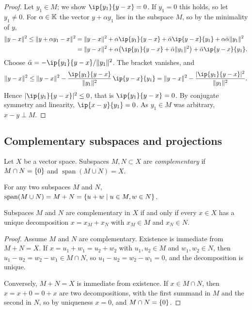 \begin{proof}
Let $y_1 \in M$; we show $\ip{y_1}{y - x} = 0$. If $y_1 = 0$ this holds, so
let $y_1 \ne 0$. For $\alpha \in \mathbb{K}$ the vector $y + \alpha y_1$ lies in the
subspace $M$, so by the minimality of $y$,
\[
  \begin{aligned}
    \norm{y - x}^2 \le \norm{y + \alpha y_1 - x}^2
    &= \norm{y - x}^2 + \alpha\ip{y_1}{y - x} + \bar{\alpha}\ip{y - x}{y_1}
       + \alpha\bar{\alpha}\norm{y_1}^2 \\
    &= \norm{y - x}^2 + \alpha\bigl(\ip{y_1}{y - x}
       + \bar{\alpha}\norm{y_1}^2\bigr) + \bar{\alpha}\ip{y - x}{y_1} .
  \end{aligned}
\]
Choose $\bar{\alpha} = -\ip{y_1}{y - x} / \norm{y_1}^2$. The bracket vanishes,
and
\[
  \norm{y - x}^2 \le \norm{y - x}^2
    - \frac{\ip{y_1}{y - x}}{\norm{y_1}^2}\,\ip{y - x}{y_1}
  = \norm{y - x}^2 - \frac{\abs{\ip{y_1}{y - x}}^2}{\norm{y_1}^2} .
\]
Hence $\abs{\ip{y_1}{y - x}}^2 \le 0$, that is $\ip{y_1}{y - x} = 0$. By
conjugate symmetry and linearity, $\ip{x - y}{y_1} = 0$. As $y_1 \in M$ was
arbitrary, $x - y \perp M$.
\end{proof}

\subsection{Complementary subspaces and projections}

\begin{definition}\label{def:complementary}
Let $X$ be a vector space. Subspaces $M, N \subset X$ are
\emph{complementary} if $M \cap N = \{0\}$ and
$\operatorname{span}(M \cup N) = X$.
\end{definition}

\begin{remark}
For any two subspaces $M$ and $N$,
$\operatorname{span}(M \cup N) = M + N = \{u + w \mid u \in M, w \in N\}$.
\end{remark}

\begin{lemma}\label{lem:complementary}
Subspaces $M$ and $N$ are complementary in $X$ if and only if every
$x \in X$ has a unique decomposition $x = x_M + x_N$ with $x_M \in M$ and
$x_N \in N$.
\end{lemma}

\begin{proof}
Assume $M$ and $N$ are complementary. Existence is immediate from
$M + N = X$. If $x = u_1 + w_1 = u_2 + w_2$ with $u_1, u_2 \in M$ and
$w_1, w_2 \in N$, then $u_1 - u_2 = w_2 - w_1 \in M \cap N$, so
$u_1 - u_2 = w_2 - w_1 = 0$, and the decomposition is unique.

Conversely, $M + N = X$ is immediate from existence. If
$x \in M \cap N$, then $x = x + 0 = 0 + x$ are two decompositions, with the
first summand in $M$ and the second in $N$, so by uniqueness $x = 0$, and
$M \cap N = \{0\}$.
\end{proof}

